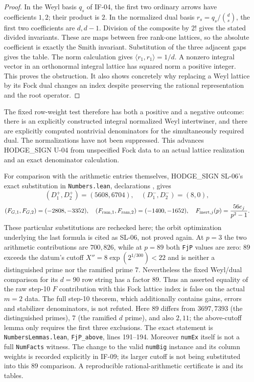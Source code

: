 \documentclass[11pt,a4paper]{article}
\theoremstyle{definition}
\theoremstyle{remark}
\begin{document}
\begin{proof}
In the Weyl basis $q_s$ of IF-04, the first two ordinary arrows have
coefficients $1,2$; their product is $2$. In the normalized dual basis
$r_s=q_s/\binom ds$, the first two coefficients are $d,d-1$. Division
of the composite by $2!$ gives the stated divided invariants. These are
maps between free rank-one lattices, so the absolute coefficient is
exactly the Smith invariant. Substitution of the three adjacent gaps
gives the table. The norm calculation gives
$\langle r_1,r_1\rangle=1/d$. A nonzero integral vector in an
orthonormal integral lattice has squared norm a positive integer. This
proves the obstruction. It also shows concretely why replacing a Weyl
lattice by its Fock dual changes an index despite preserving the
rational representation and the root operator.
\end{proof}

The fixed row-weight test therefore has both a positive and a negative
outcome: there is an explicitly constructed integral normalized Weyl
intertwiner, and there are explicitly computed nontrivial denominators
for the simultaneously required dual. The normalizations have not been
suppressed. This advances HODGE\_SIGN U-04 from unspecified Fock data to
an actual lattice realization and an exact denominator calculation.

For comparison with the arithmetic entries themselves, HODGE\_SIGN
SL-06's exact substitution in \texttt{Numbers.lean}, declarations
, gives
\[
 (D_1^+,D_2^+)=(5608,6704),\quad(D_1^-,D_2^-)=(8,0),
\]
\[
 (F_{G,1},F_{G,2})=(-2808,-3352),\quad
 (F_{{\rm ram},1},F_{{\rm ram},2})=(-1400,-1652),\quad
 F_{{\rm inert},j}(p)=\frac{56e_j}{p^2-1}.
\]
These particular substitutions are rechecked here; the orbit optimization
underlying the last formula is cited as SL-06, not proved again.
At $p=3$ the two arithmetic contributions are $700,826$, while at
$p=89$ both \texttt{FjP} values are zero: $89$ exceeds the datum's cutoff
$X''=8\exp(2^{1/300})<22$ and is neither a distinguished prime nor the
ramified prime $7$. Nevertheless the fixed Weyl/dual comparison for its
$d=90$ row string has a factor $89$. Thus an asserted equality of the
raw step-10 $F$ contribution with this Fock lattice index is false on
the actual $m=2$ data. The full step-10 theorem, which additionally
contains gains, errors and stabilizer denominators, is not refuted.
Here $89$ differs from $3697,7393$ (the distinguished primes),
$7$ (the ramified $d$ prime), and also $2,11$; the above-cutoff
lemma only requires the first three exclusions. The exact statement is
\texttt{NumbersLemmas.lean}, \texttt{FjP\_above}, lines 191--194.
Moreover \texttt{numEx} itself is not a full \texttt{NumFacts}
witness. The change to the valid \texttt{numBig} instance and its
column weights is recorded explicitly in IF-09; its larger cutoff
is not being substituted into this $89$ comparison.
A reproducible rational-arithmetic certificate is
 and its tables.
\end{document}
